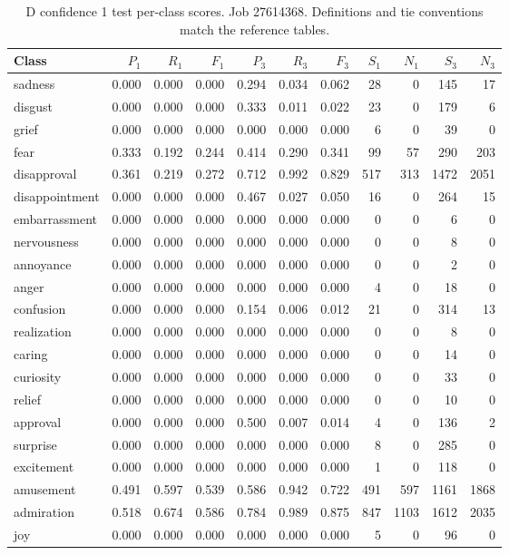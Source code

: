 \begin{table}[!htbp]
\centering
\scriptsize
\setlength{\tabcolsep}{5pt}
\begin{tabular}{lrrrrrrrrrr}
\toprule
Class & $P_1$ & $R_1$ & $F_1$ & $P_3$ & $R_3$ & $F_3$ & $S_1$ & $N_1$ & $S_3$ & $N_3$ \\
\midrule
sadness & 0.000 & 0.000 & 0.000 & 0.294 & 0.034 & 0.062 & 28 & 0 & 145 & 17 \\
disgust & 0.000 & 0.000 & 0.000 & 0.333 & 0.011 & 0.022 & 23 & 0 & 179 & 6 \\
grief & 0.000 & 0.000 & 0.000 & 0.000 & 0.000 & 0.000 & 6 & 0 & 39 & 0 \\
fear & 0.333 & 0.192 & 0.244 & 0.414 & 0.290 & 0.341 & 99 & 57 & 290 & 203 \\
disapproval & 0.361 & 0.219 & 0.272 & 0.712 & 0.992 & 0.829 & 517 & 313 & 1472 & 2051 \\
disappointment & 0.000 & 0.000 & 0.000 & 0.467 & 0.027 & 0.050 & 16 & 0 & 264 & 15 \\
embarrassment & 0.000 & 0.000 & 0.000 & 0.000 & 0.000 & 0.000 & 0 & 0 & 6 & 0 \\
nervousness & 0.000 & 0.000 & 0.000 & 0.000 & 0.000 & 0.000 & 0 & 0 & 8 & 0 \\
annoyance & 0.000 & 0.000 & 0.000 & 0.000 & 0.000 & 0.000 & 0 & 0 & 2 & 0 \\
anger & 0.000 & 0.000 & 0.000 & 0.000 & 0.000 & 0.000 & 4 & 0 & 18 & 0 \\
confusion & 0.000 & 0.000 & 0.000 & 0.154 & 0.006 & 0.012 & 21 & 0 & 314 & 13 \\
realization & 0.000 & 0.000 & 0.000 & 0.000 & 0.000 & 0.000 & 0 & 0 & 8 & 0 \\
caring & 0.000 & 0.000 & 0.000 & 0.000 & 0.000 & 0.000 & 0 & 0 & 14 & 0 \\
curiosity & 0.000 & 0.000 & 0.000 & 0.000 & 0.000 & 0.000 & 0 & 0 & 33 & 0 \\
relief & 0.000 & 0.000 & 0.000 & 0.000 & 0.000 & 0.000 & 0 & 0 & 10 & 0 \\
approval & 0.000 & 0.000 & 0.000 & 0.500 & 0.007 & 0.014 & 4 & 0 & 136 & 2 \\
surprise & 0.000 & 0.000 & 0.000 & 0.000 & 0.000 & 0.000 & 8 & 0 & 285 & 0 \\
excitement & 0.000 & 0.000 & 0.000 & 0.000 & 0.000 & 0.000 & 1 & 0 & 118 & 0 \\
amusement & 0.491 & 0.597 & 0.539 & 0.586 & 0.942 & 0.722 & 491 & 597 & 1161 & 1868 \\
admiration & 0.518 & 0.674 & 0.586 & 0.784 & 0.989 & 0.875 & 847 & 1103 & 1612 & 2035 \\
joy & 0.000 & 0.000 & 0.000 & 0.000 & 0.000 & 0.000 & 5 & 0 & 96 & 0 \\
\bottomrule
\end{tabular}
\caption{D confidence 1 test per-class scores. Job 27614368. Definitions and tie conventions match the reference tables.}
\label{tab:classes-d_confidence_k1}
\end{table}
